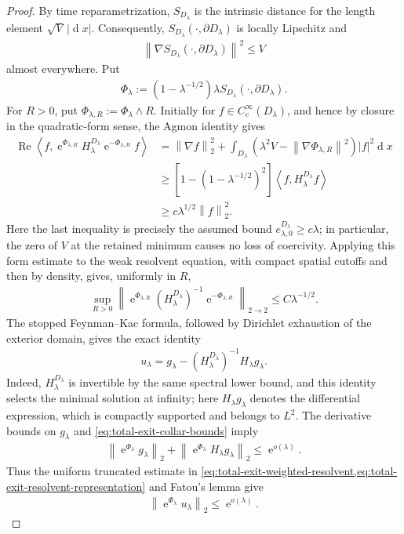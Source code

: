 \documentclass[a4paper,10pt]{article}
\numberwithin{equation}{section}
\theoremstyle{plain}
\theoremstyle{plain}
\theoremstyle{plain}
\theoremstyle{plain}
\theoremstyle{plain}
\theoremstyle{remark}
\theoremstyle{definition}
\newcommand{\ee}{\operatorname{e}}
\newcommand\norm[1]{\left\lVert#1\right\rVert}
\newcommand{\dif}{\operatorname{d}\!} %
\newcommand{\abs}[1]{\left\lvert#1\right\rvert}
\newcommand{\eq}[1]{\begin{align*}#1\end{align*}}
\newcommand{\eql}[1]{\begin{align}#1\end{align}}
\newcommand{\br}[1]{\left(#1\right)}
\begin{document}
\begin{proof}
By time reparametrization, $S_{D_\lambda}$ is the intrinsic distance
for the length element $\sqrt V\,\abs{\dif{x}}$. Consequently,
$S_{D_\lambda}(\cdot,\partial D_\lambda)$ is locally Lipschitz and
\eq{
\norm{
\nabla S_{D_\lambda}\br{\cdot,\partial D_\lambda}
}^2
\leq
V
}
almost everywhere. Put
\eq{
\Phi_\lambda
:=
\br{1-\lambda^{-1/2}}
\lambda
S_{D_\lambda}\br{\cdot,\partial D_\lambda}.
}
For $R>0$, put $\Phi_{\lambda,R}:=\Phi_\lambda\wedge R$. Initially
for $f\in C_c^\infty(D_\lambda)$, and hence by closure in the
quadratic-form sense, the Agmon identity gives
\eql{
\operatorname{Re}
\left\langle
f,
\ee^{\Phi_{\lambda,R}}
H_\lambda^{D_\lambda}
\ee^{-\Phi_{\lambda,R}}f
\right\rangle
&=
\norm{\nabla f}_2^2
+
\int_{D_\lambda}
\left(
\lambda^2V-\norm{\nabla\Phi_{\lambda,R}}^2
\right)
\abs{f}^2\dif{x}
\nonumber\\
&\geq
\left[
1-\br{1-\lambda^{-1/2}}^2
\right]
\left\langle
f,H_\lambda^{D_\lambda}f
\right\rangle
\nonumber\\
&\geq
c\lambda^{1/2}\norm{f}_2^2.
\label{eq:total-exit-weighted-coercivity}
}
Here the last inequality is precisely the assumed bound
$e_{\lambda,0}^{D_\lambda}\geq c\lambda$; in particular, the zero of
$V$ at the retained minimum causes no loss of coercivity. Applying
this form estimate to the weak resolvent equation, with compact
spatial cutoffs and then by density, gives, uniformly in $R$,
\eql{
\sup_{R>0}
\norm{
\ee^{\Phi_{\lambda,R}}
\br{H_\lambda^{D_\lambda}}^{-1}
\ee^{-\Phi_{\lambda,R}}
}_{2\to2}
\leq
C\lambda^{-1/2}.
\label{eq:total-exit-weighted-resolvent}
}
The stopped Feynman--Kac formula, followed by Dirichlet exhaustion of
the exterior domain, gives the exact identity
\eql{
u_\lambda
=
g_\lambda
-
\br{H_\lambda^{D_\lambda}}^{-1}H_\lambda g_\lambda.
\label{eq:total-exit-resolvent-representation}
}
Indeed, $H_\lambda^{D_\lambda}$ is invertible by the same spectral
lower bound, and this identity selects the minimal solution at
infinity; here $H_\lambda g_\lambda$ denotes the differential
expression, which is compactly supported and belongs to $L^2$. The
derivative bounds on $g_\lambda$ and
\cref{eq:total-exit-collar-bounds} imply
\eq{
\norm{\ee^{\Phi_\lambda}g_\lambda}_2
+
\norm{\ee^{\Phi_\lambda}H_\lambda g_\lambda}_2
\leq
\ee^{o(\lambda)}.
}
Thus the uniform truncated estimate in
\cref{eq:total-exit-weighted-resolvent,eq:total-exit-resolvent-representation}
and Fatou's lemma give
\eql{
\norm{\ee^{\Phi_\lambda}u_\lambda}_2
\leq
\ee^{o(\lambda)}.
\label{eq:total-exit-weighted-L2}
}


\end{proof}
\end{document}
